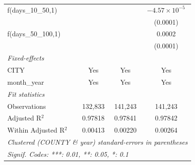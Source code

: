 \begin{tabular}{lccc}
   f(days\_10\_50,1)                           &          &                        & $-4.57\times 10^{-5}$\\    
                                               &          &                        & (0.0001)\\   
   f(days\_50\_100,1)                          &          &                        & 0.0002\\   
                                               &          &                        & (0.0001)\\   
   \midrule
   \emph{Fixed-effects}\\
   CITY                                        & Yes      & Yes                    & Yes\\  
   month\_year                                 & Yes      & Yes                    & Yes\\  
   \midrule
   \emph{Fit statistics}\\
   Observations                                & 132,833  & 141,243                & 141,243\\  
   Adjusted R$^2$                              & 0.97818  & 0.97841                & 0.97842\\  
   Within Adjusted R$^2$                       & 0.00413  & 0.00220                & 0.00264\\  
   \midrule \midrule
   \multicolumn{4}{l}{\emph{Clustered (COUNTY \& year) standard-errors in parentheses}}\\
   \multicolumn{4}{l}{\emph{Signif. Codes: ***: 0.01, **: 0.05, *: 0.1}}\\
\end{tabular}
\par\endgroup


